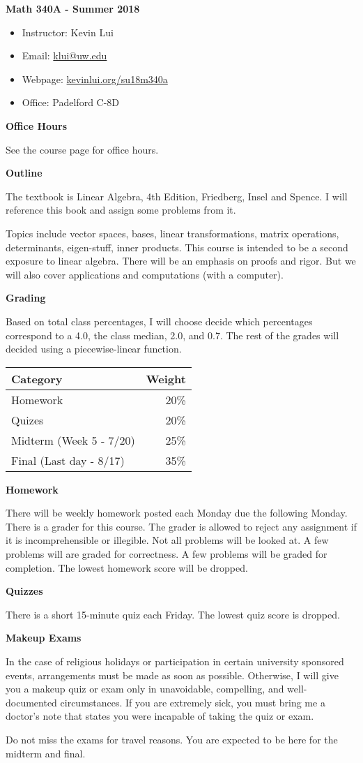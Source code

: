 \documentclass{article}
\begin{document}
\textbf{\huge  Math 340A - Summer 2018}
\begin{itemize}
    \item
        Instructor: Kevin Lui
    \item
        Email: \href{mailto:klui@uw.edu}{klui@uw.edu}
    \item
        Webpage: \url{kevinlui.org/su18m340a}
    \item
        Office: Padelford C-8D
\end{itemize}

\textbf{Office Hours}

See the course page for office hours.

\textbf{Outline}

The textbook is Linear Algebra, 4th Edition, Friedberg, Insel and Spence. I
will reference this book and assign some problems from it.  

Topics include vector spaces, bases, linear transformations, matrix operations,
determinants, eigen-stuff, inner products.  This course is intended to be a
second exposure to linear algebra. There will be an emphasis on proofs and
rigor. But we will also cover applications and computations (with a computer).

\textbf{Grading}

Based on total class percentages, I will choose decide which percentages
correspond to a 4.0, the class median, 2.0, and 0.7. The rest of the grades
will decided using a piecewise-linear function.

\begin{tabular}{ l r }
    Category  & Weight   \\
    \hline
    Homework  & 20\%      \\
    Quizes  & 20\%      \\
    Midterm (Week 5 - 7/20) & 25\%      \\
    Final (Last day - 8/17)    & 35\%
\end{tabular}

\textbf{Homework}

There will be weekly homework posted each Monday due the following Monday.
There is a grader for this course.  The grader is allowed to reject any
assignment if it is incomprehensible or illegible.  Not all problems will be
looked at. A few problems will are graded for correctness. A few problems will
 be graded for completion.  The lowest homework score will be dropped.

\textbf{Quizzes}

There is a short 15-minute quiz each Friday. The lowest quiz score is dropped.

\textbf{Makeup Exams}

In the case of religious holidays or participation in certain university
sponsored events, arrangements must be made as soon as possible. Otherwise, I
will give you a makeup quiz or exam only in unavoidable, compelling, and
well-documented circumstances. If you are extremely sick, you must bring me a
doctor's note that states you were incapable of taking the quiz or exam. 

Do not miss the exams for travel reasons. You are expected to be here for the
midterm and final.
\end{document}
